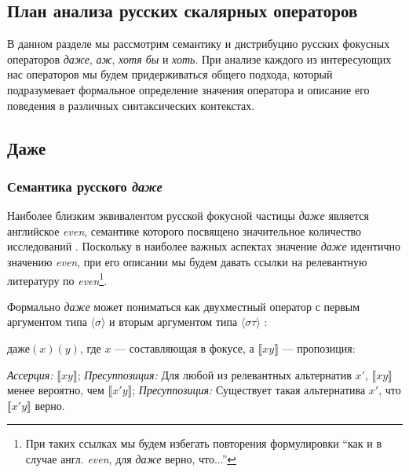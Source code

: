 \documentclass[a4paper, titlepage]{article}
\begin{document}
\subsection{План анализа русских скалярных операторов} \label{additivityClassification}

В данном разделе мы рассмотрим семантику и дистрибуцию русских фокусных операторов \textit{даже}, \textit{аж}, \textit{хотя бы} и \textit{хоть}. При анализе каждого из интересующих нас операторов мы будем придерживаться общего подхода, который подразумевает формальное определение значения оператора и описание его поведения в различных синтаксических контекстах.

\subsection{Даже}

\subsubsection{Семантика русского \textit{даже}}

Наиболее близким эквивалентом русской фокусной частицы \textit{даже} является английское \textit{even}, семантике которого посвящено значительное количество исследований \citep{horn1969presuppositional,stalnaker1974pragmatic,rullmann1997even,iatridou2016our,kay1990even}. Поскольку в наиболее важных аспектах значение \textit{даже} идентично значению \textit{even}, при его описании мы будем давать ссылки на релевантную литературу по \textit{even}\footnote{При таких ссылках мы будем избегать повторения формулировки ``как и в случае англ. \textit{even}, для \textit{даже} верно, что...''}.

\medskip

Формально \textit{даже} может пониматься как двухместный оператор с первым аргументом типа $ \langle \sigma \rangle $ и вторым аргументом типа $ \langle \sigma \tau \rangle $ \citep{wagner2006association}:

\begin{exe}
    \ex $ \textit{даже}(x)(y) $, где $ x $ --- составляющая в фокусе, а $ \llbracket xy \rrbracket $ --- пропозиция: \begin{xlist}
        \ex \textit{Ассерция:} $ \llbracket xy \rrbracket $;
        \ex \textit{Пресуппозиция:} Для любой из релевантных альтернатив $ x' $, $ \llbracket xy \rrbracket $ менее вероятно, чем $ \llbracket x'y \rrbracket $;
        \ex \textit{Пресуппозиция:} Существует такая альтернатива $ x' $, что $ \llbracket x'y \rrbracket $ верно.
    \end{xlist}
\end{exe}
\end{document}
